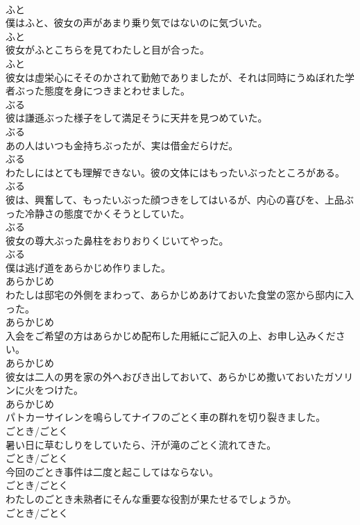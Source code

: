 \documentclass[8pt]{extreport}
\begin{document}
\begin{CJK}{UTF8}{min}
\\	ふと
\\	僕はふと、彼女の声があまり乗り気ではないのに気づいた。	
\\	ふと
\\	彼女がふとこちらを見てわたしと目が合った。	
\\	ふと
\\	彼女は虚栄心にそそのかされて勤勉でありましたが、それは同時にうぬぼれた学者ぶった態度を身につきまとわせました。	
\\	ぶる
\\	彼は謙遜ぶった様子をして満足そうに天井を見つめていた。	
\\	ぶる
\\	あの人はいつも金持ちぶったが、実は借金だらけだ。	
\\	ぶる
\\	わたしにはとても理解できない。彼の文体にはもったいぶったところがある。	
\\	ぶる
\\	彼は、興奮して、もったいぶった顔つきをしてはいるが、内心の喜びを、上品ぶった冷静さの態度でかくそうとしていた。	
\\	ぶる
\\	彼女の尊大ぶった鼻柱をおりおりくじいてやった。	
\\	ぶる
\\	僕は逃げ道をあらかじめ作りました。	
\\	あらかじめ
\\	わたしは邸宅の外側をまわって、あらかじめあけておいた食堂の窓から邸内に入った。	
\\	あらかじめ
\\	入会をご希望の方はあらかじめ配布した用紙にご記入の上、お申し込みください。	
\\	あらかじめ
\\	彼女は二人の男を家の外へおびき出しておいて、あらかじめ撒いておいたガソリンに火をつけた。	
\\	あらかじめ
\\	パトカーサイレンを鳴らしてナイフのごとく車の群れを切り裂きました。	
\\	ごとき/ごとく
\\	暑い日に草むしりをしていたら、汗が滝のごとく流れてきた。	
\\	ごとき/ごとく
\\	今回のごとき事件は二度と起こしてはならない。	
\\	ごとき/ごとく
\\	わたしのごとき未熟者にそんな重要な役割が果たせるでしょうか。	
\\	ごとき/ごとく

\end{CJK}
\end{document}
